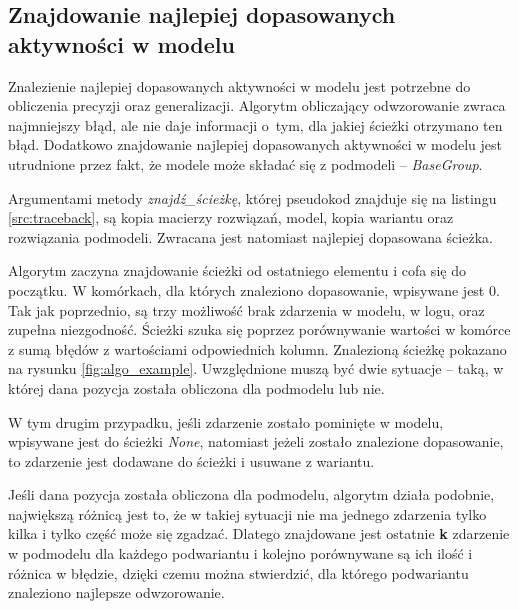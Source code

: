\subsection{Znajdowanie najlepiej dopasowanych aktywności w modelu}
Znalezienie najlepiej dopasowanych aktywności w modelu jest potrzebne do obliczenia precyzji oraz generalizacji. Algorytm obliczający odwzorowanie zwraca najmniejszy błąd, ale nie daje informacji o~tym, dla jakiej ścieżki otrzymano ten błąd. Dodatkowo znajdowanie najlepiej dopasowanych aktywności w modelu jest utrudnione przez fakt, że modele może składać się z podmodeli -- \textit{BaseGroup}. 

Argumentami metody \textit{znajdź{\_}ścieżkę}, której pseudokod znajduje się na listingu \ref{src:traceback}, są kopia macierzy rozwiązań, model, kopia wariantu oraz rozwiązania podmodeli. Zwracana jest natomiast najlepiej dopasowana ścieżka.

Algorytm zaczyna znajdowanie ścieżki od ostatniego elementu i cofa się do początku. W komórkach, dla których znaleziono dopasowanie, wpisywane jest 0. Tak jak poprzednio, są trzy możliwość brak zdarzenia w modelu, w logu, oraz zupełna niezgodność. Ścieżki szuka się poprzez porównywanie wartości w komórce z sumą błędów z wartościami odpowiednich kolumn. Znalezioną ścieżkę pokazano na rysunku \ref{fig:algo_example}. Uwzględnione muszą być dwie sytuacje -- taką, w której dana pozycja została obliczona dla podmodelu lub nie.

W tym drugim przypadku, jeśli zdarzenie zostało pominięte w modelu, wpisywane jest do ścieżki \textit{None}, natomiast jeżeli zostało znalezione dopasowanie, to zdarzenie jest dodawane do ścieżki i usuwane z wariantu.

Jeśli dana pozycja została obliczona dla podmodelu, algorytm działa podobnie, największą różnicą jest to, że w takiej sytuacji nie ma jednego zdarzenia tylko kilka i tylko część może się zgadzać. Dlatego znajdowane jest ostatnie \textbf{k} zdarzenie w podmodelu dla każdego podwariantu i kolejno porównywane są ich ilość i różnica w błędzie, dzięki czemu można stwierdzić, dla którego podwariantu znaleziono najlepsze odwzorowanie. 

